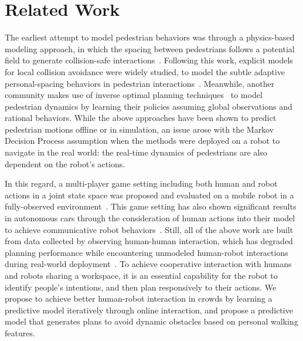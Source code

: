 \documentclass[conference]{IEEEtran}
\begin{document}
\section{Related Work}
\label{sec:related}
\vspace{-0.3em}
The earliest attempt to model pedestrian behaviors was through a physics-based 
modeling approach, in which the spacing between pedestrians follows a 
potential field to generate collision-safe 
interactions~\cite{helbing1995social}. Following this work, explicit models 
for local collision avoidance were widely studied, to model the subtle 
adaptive personal-spacing behaviors in pedestrian 
interactions~\cite{papadakis2014adaptive}. Meanwhile, another community 
makes use of inverse optimal planning 
techniques~\cite{ziebart2009planning,henry2010learning,vasquez2014inverse} to 
model pedestrian dynamics by learning their policies assuming global observations and 
rational behaviors.
While the above approaches have been shown to predict pedestrian motions 
offline or in simulation, an issue arose with the Markov Decision 
Process assumption when the methods were deployed on a robot to navigate in the real world:
the real-time dynamics of pedestrians are also dependent on the robot's 
actions. 

In this regard, a multi-player game setting including both human and robot actions in a joint state space was proposed and evaluated on a mobile robot in a fully-observed environment~\cite{trautman2010unfreezing}. This game setting has also shown significant results in autonomous cars through the consideration of human actions into their model to achieve communicative robot behaviors~\cite{sadigh2016planning}.
Still, all of the above work are built from data collected by observing human-human 
interaction, which has degraded planning performance while encountering unmodeled 
human-robot interactions during real-world 
deployment~\cite{trautman2015robot, pfeiffer2016predicting}. To achieve 
cooperative interaction with humans and robots sharing a workspace, it is 
an essential capability for the robot to identify people's 
intentions, and then plan responsively to their actions. We propose to achieve 
better human-robot interaction in crowds by learning a predictive model 
iteratively through online interaction, and propose a predictive model 
that generates plans to avoid dynamic obstacles based on personal walking features. 
\end{document}
